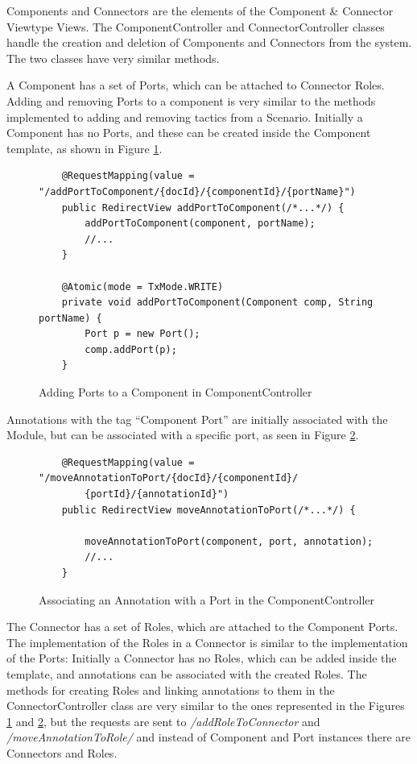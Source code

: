 Components and Connectors are the elements of the Component \& Connector Viewtype Views. The ComponentController and ConnectorController classes handle the creation and deletion of Components and Connectors from the system. The two classes have very similar methods.

A Component has a set of Ports, which can be attached to Connector Roles. Adding and removing Ports to a component is very similar to the methods implemented to adding and removing tactics from a Scenario. Initially a Component has no Ports, and these can be created inside the Component template, as shown in Figure \ref{figure:ComponentControllerAddingPorts}. 
\begin{figure}[h]
\lstset{style=customjava}
\begin{lstlisting}
	@RequestMapping(value = "/addPortToComponent/{docId}/{componentId}/{portName}")
	public RedirectView addPortToComponent(/*...*/) {		
		addPortToComponent(component, portName);
		//...
	}

	@Atomic(mode = TxMode.WRITE)
	private void addPortToComponent(Component comp, String portName) {
		Port p = new Port();
		comp.addPort(p);
	}
\end{lstlisting}
\caption{Adding Ports to a Component in ComponentController}
\label{figure:ComponentControllerAddingPorts}
\end{figure}

Annotations with the tag ``Component Port'' are initially associated with the Module, but can be associated with a specific port, as seen in Figure \ref{figure:ComponentControllerLinkToPort}. 

\begin{figure}[h]
\lstset{style=customjava}
\begin{lstlisting}
	@RequestMapping(value = "/moveAnnotationToPort/{docId}/{componentId}/
		{portId}/{annotationId}")
	public RedirectView moveAnnotationToPort(/*...*/) {
		
		moveAnnotationToPort(component, port, annotation);
		//...
	}	
\end{lstlisting}
\caption{Associating an Annotation with a Port in the ComponentController}
\label{figure:ComponentControllerLinkToPort}
\end{figure}

The Connector has a set of Roles, which are attached to the Component Ports. The implementation of the Roles in a Connector is similar to the implementation of the Ports: Initially a Connector has no Roles, which can be added inside the template, and annotations can be associated with the created Roles. The methods for creating Roles and linking annotations to them in the ConnectorController class are very similar to the ones represented in the Figures \ref{figure:ComponentControllerAddingPorts} and \ref{figure:ComponentControllerLinkToPort}, but the requests are sent to \textit{/addRoleToConnector} and \textit{/moveAnnotationToRole/} and instead of Component and Port instances there are Connectors and Roles.

